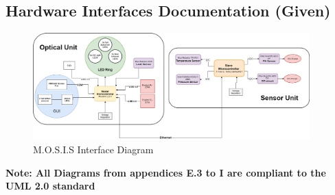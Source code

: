 \subsection{Hardware Interfaces Documentation (Given)}
\begin{figure}[H]
  \begin{center}
    \includegraphics[width=0.95\textwidth]{../Appendix/System_Architecture_and_Interfaces/Hardware_Interfaces_Documentation/Figures/interfaces_diagram.png}
  \caption{M.O.S.I.S Interface Diagram}
  \end{center}
\end{figure}
\textbf{Note: All Diagrams from appendices E.3 to I are compliant to the UML 2.0 standard}